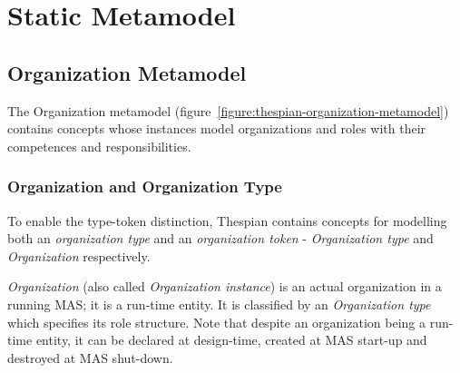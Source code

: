 
\section{Static Metamodel}

\subsection{Organization Metamodel}

The Organization metamodel (figure~\ref{figure:thespian-organization-metamodel}) contains concepts whose instances model organizations and roles with their competences and responsibilities.

\subsubsection*{Organization and Organization Type}

To enable the type-token distinction, Thespian contains concepts for modelling both an \textit{organization type} and an \textit{organization token} - \textit{Organization type} and \textit{Organization} respectively.

\textit{Organization} (also called \textit{Organization instance}) is an actual organization in a running MAS; it is a run-time entity.
It is classified by an \textit{Organization type} which specifies its role structure.
Note that despite an organization being a run-time entity, it can be declared at design-time, created at MAS start-up and destroyed at MAS shut-down.


